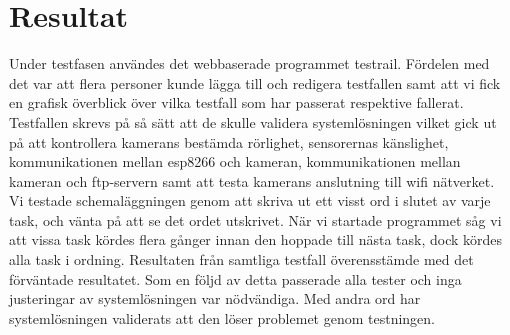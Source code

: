 

\chapter{Resultat} %
\label{resultat}







Under testfasen användes det webbaserade programmet testrail. Fördelen med det var att flera personer kunde lägga till och redigera testfallen samt att vi fick en grafisk överblick över vilka testfall som har passerat respektive fallerat. 
Testfallen skrevs på så sätt att de skulle validera systemlösningen vilket gick ut på att kontrollera kamerans bestämda rörlighet, sensorernas känslighet, kommunikationen mellan esp8266 och kameran, kommunikationen mellan kameran och ftp-servern samt att testa kamerans anslutning till wifi nätverket.
Vi testade schemaläggningen genom att skriva ut ett visst ord i slutet av varje task, och vänta på att se det ordet utskrivet. När vi startade programmet såg vi att vissa task kördes flera gånger innan den hoppade till nästa task, dock kördes alla task i ordning. 
Resultaten från samtliga testfall överensstämde med det förväntade resultatet. Som en följd av detta passerade alla tester och inga justeringar av systemlösningen var nödvändiga. Med andra ord har systemlösningen validerats att den löser problemet genom testningen.



